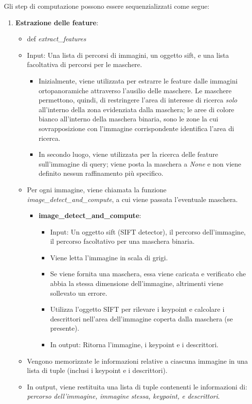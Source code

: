 \documentclass[12pt,a4paper,openright,twoside]{book}
\begin{document}
Gli step di computazione possono essere sequenzializzati come segue:
\begin{enumerate}
\item \textbf{Estrazione delle feature}:
\begin{itemize}
\item def {\itshape extract\_features}
\item Input: Una lista di percorsi di immagini, un oggetto sift, e una lista facoltativa di percorsi per le maschere.
\begin{itemize}
\item Inizialmente, viene utilizzata per estrarre le feature dalle immagini ortopanoramiche attraverso l'ausilio delle maschere. Le maschere permettono, quindi, di restringere l'area di interesse di ricerca {\itshape solo} all'interno della zona evidenziata dalla maschera; le aree di colore bianco all'interno della maschera binaria, sono le zone la cui sovrapposizione con l'immagine corrispondente identifica l'area di ricerca.
\item In secondo luogo, viene utilizzata per la ricerca delle feature sull'immagine di query; viene posta la maschera a {\itshape None} e non viene definito nessun raffinamento più specifico.
\end{itemize}
\item Per ogni immagine, viene chiamata la funzione {\itshape image\_detect\_and\_compute}, a cui viene passata l'eventuale maschera.
\begin{itemize}
\item \textbf{image\_detect\_and\_compute}:
\begin{itemize}
\item Input: Un oggetto sift (SIFT detector), il percorso dell'immagine, il percorso facoltativo per una maschera binaria.
\item Viene letta l'immagine in scala di grigi.
\item Se viene fornita una maschera, essa viene caricata e verificato che abbia la stessa dimensione dell'immagine, altrimenti viene sollevato un errore.
\item Utilizza l'oggetto SIFT per rilevare i keypoint e calcolare i descrittori nell'area dell'immagine coperta dalla maschera (se presente).
\item In output: Ritorna l'immagine, i keypoint e i descrittori.
\begin{figure}[H]
	\centering
    	
\end{figure} 
\end{itemize}
\end{itemize}
\item Vengono memorizzate  le informazioni relative a ciascuna immagine  in una lista di tuple (inclusi i keypoint e i descrittori).
\item In output, viene restituita una lista di tuple contenenti le informazioni di: {\itshape percorso dell'immagine, immagine stessa, keypoint, e descrittori}.
\end{itemize}


\end{enumerate}
\end{document}
